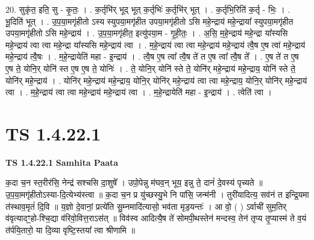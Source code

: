 \documentclass[17pt]{extarticle}
\begin{document}
20. सुकृ॑त॒ इति॒ सु - कृ॒तः॒ । . क॒र्तृभि॑र् भूद् भूत् क॒र्तृभिः॑ क॒र्तृभि॑र् भूत् । . क॒र्तृभि॒रिति॑ क॒र्तृ - भिः॒ । . भू॒दिति॑ भूत् । . उ॒प॒या॒मगृ॑हीतो ऽस्य स्युपया॒मगृ॑हीत उपया॒मगृ॑हीतो ऽसि महे॒न्द्राय॑ महे॒न्द्राया᳚ स्युपया॒मगृ॑हीत उपया॒मगृ॑हीतो ऽसि महे॒न्द्राय॑ । . उ॒प॒या॒मगृ॑हीत॒ इत्यु॑पया॒म - गृ॒ही॒तः॒ । . अ॒सि॒ म॒हे॒न्द्राय॑ महे॒न्द्रा या᳚स्यसि महे॒न्द्राय॑ त्वा त्वा महे॒न्द्रा या᳚स्यसि महे॒न्द्राय॑ त्वा । . म॒हे॒न्द्राय॑ त्वा त्वा महे॒न्द्राय॑ महे॒न्द्राय॑ त्वै॒ष ए॒ष त्वा॑ महे॒न्द्राय॑ महे॒न्द्राय॑ त्वै॒षः । . म॒हे॒न्द्रायेति॑ महा - इ॒न्द्राय॑ । . त्वै॒ष ए॒ष त्वा᳚ त्वै॒ष ते॑ त ए॒ष त्वा᳚ त्वै॒ष ते᳚ । . ए॒ष ते॑ त ए॒ष ए॒ष ते॒ योनि॒र् योनि॑ स्त ए॒ष ए॒ष ते॒ योनिः॑ । . ते॒ योनि॒र् योनि॑ स्ते ते॒ योनि॑र् महे॒न्द्राय॑ महे॒न्द्राय॒ योनि॑ स्ते ते॒ योनि॑र् महे॒न्द्राय॑ । . योनि॑र् महे॒न्द्राय॑ महे॒न्द्राय॒ योनि॒र् योनि॑र् महे॒न्द्राय॑ त्वा त्वा महे॒न्द्राय॒ योनि॒र् योनि॑र् महे॒न्द्राय॑ त्वा । . म॒हे॒न्द्राय॑ त्वा त्वा महे॒न्द्राय॑ महे॒न्द्राय॑ त्वा । . म॒हे॒न्द्रायेति॑ महा - इ॒न्द्राय॑ । . त्वेति॑ त्वा । \newline
\pagebreak
{}
\section*{ TS 1.4.22.1 }

\textbf{TS 1.4.22.1 } \newline
\textbf{Samhita Paata} \newline

क॒दा च॒न स्त॒रीर॑सि॒ नेन्द्र॑ सश्चसि दा॒शुषे᳚ । उपो॒पेन्नु म॑घव॒न् भूय॒ इन्नु ते॒ दानं॑ दे॒वस्य॑ पृच्यते ॥ उ॒प॒या॒मगृ॑हीतोऽस्या-दि॒त्येभ्य॑स्त्वा ॥ क॒दा च॒न प्र यु॑च्छस्यु॒भे नि पा॑सि॒ जन्म॑नी । तुरी॑यादित्य॒ सव॑नं त इन्द्रि॒यमा त॑स्थाव॒मृतं॑ दि॒वि ॥ य॒ज्ञो दे॒वानां॒ प्रत्ये॑ति सु॒म्नमादि॑त्यासो॒ भव॑ता मृड॒यन्तः॑ । आ वो॒ ( ) ऽर्वाची॑ सुम॒तिर् व॑वृत्यादꣳ॒॒हो-श्चि॒द्या व॑रिवो॒वित्त॒राऽस॑त् ॥ विव॑स्व आदित्यै॒ष ते॑ सोमपी॒थस्तेन॑ मन्दस्व॒ तेन॑ तृप्य तृ॒प्यास्म॑ ते व॒यं त॑र्पयि॒तारो॒ या दि॒व्या वृष्टि॒स्तया᳚ त्वा श्रीणामि ॥ \newline
\end{document}
